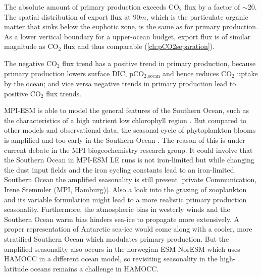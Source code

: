 The absolute amount of primary production exceeds CO$_2$ flux by a factor of $\sim$20. The spatial distribution of export flux at $90m$, which is the particulate organic matter that sinks below the euphotic zone, is the same as for primary production. As a lower vertical boundary for a upper-ocean budget, export flux is of similar magnitude as CO$_2$ flux and thus comparable (\autoref{ch:pCO2separation}).\newline

The negative CO$_2$ flux trend has a positive trend in primary production, because primary production lowers surface \acs{DIC}, pCO$_{2\text{,ocean}}$ and hence reduces CO$_2$ uptake by the ocean; and vice versa negative trends in primary production lead to positive CO$_2$ flux trends.\newline 

\acs{MPI-ESM} is able to model the general features of the Southern Ocean, such as the characteristics of a high nutrient low chlorophyll region \citep{Bopp2013}. But compared to other models and observational data, the seasonal cycle of phytoplankton blooms is amplified and too early in the Southern Ocean \citep{Bopp2013,Nevison2015,Nevison2016}. The reason of this is under current debate in the MPI biogeochemistry research group. It could involve that the Southern Ocean in \acs{MPI-ESM LE} runs is not iron-limited but while changing the dust input fields and the iron cycling constants lead to an iron-limited Southern Ocean the amplified seasonality is still present [private Communication, Irene Stemmler (MPI, Hamburg)]. Also a look into the grazing of zooplankton and its variable formulation might lead to a more realistic primary production seasonality. Furthermore, the atmospheric bias in westerly winds and the Southern Ocean warm bias \citep{Jungclaus2013} hinders sea-ice to propagate more extensively. A proper representation of Antarctic sea-ice would come along with a cooler, more stratified Southern Ocean which modulates primary production. But the amplified seasonality also occurs in the norwegian \acs{ESM} NorESM which uses \acs{HAMOCC} in a different ocean model, so revisiting seasonality in the high-latitude oceans remains a challenge in \acs{HAMOCC}.

